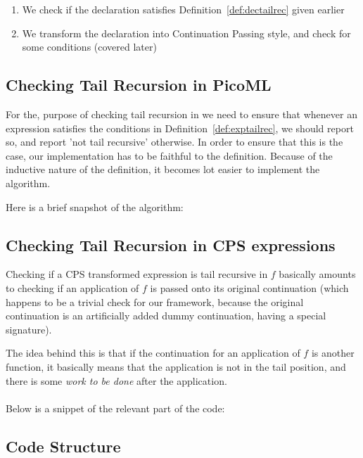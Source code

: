 \begin{enumerate}
 \item We check if the declaration satisfies Definition~\ref{def:dectailrec} given earlier
 \item We transform the declaration into Continuation Passing style, and check for some conditions (covered later)
\end{enumerate}

\subsection{Checking Tail Recursion in PicoML}

For the, purpose of checking tail recursion in \tool
we need to ensure that whenever an expression satisfies the conditions in Definition~\ref{def:exptailrec}, we should report so,
and report 'not tail recursive' otherwise.
In order to ensure that this is the case, our implementation has to be faithful to the definition.
Because of the inductive nature of the definition, it becomes lot easier to implement the algorithm.

Here is a brief snapshot of the algorithm:

 

\subsection{Checking Tail Recursion in CPS expressions}

Checking if a CPS transformed expression is tail recursive in $f$ basically amounts to checking if
an application of $f$ is passed onto its original continuation (which happens to be a trivial check for our framework, because the
original continuation is an artificially added dummy continuation, having a special signature).

The idea behind this is that if the continuation for an application of $f$ is another function, it basically means that
the application is not in the tail position, and there is some \emph{work to be done} after the application.
\\\\
Below is a snippet of the relevant part of the code:




\subsection{Code Structure}

